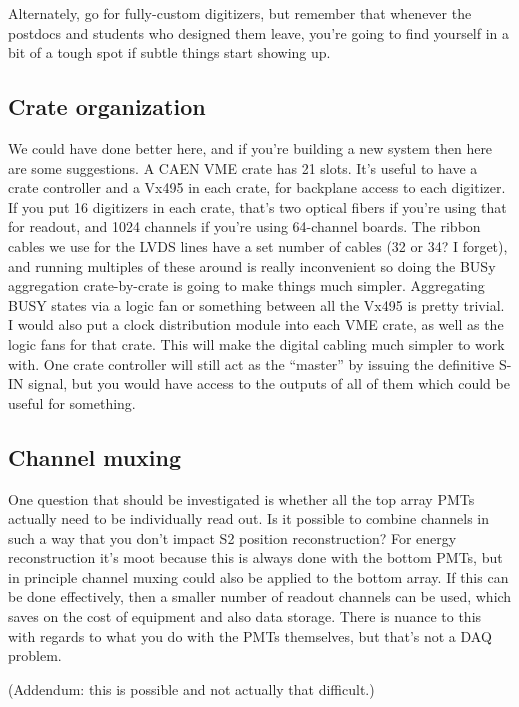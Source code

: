 Alternately, go for fully-custom digitizers, but remember that whenever the postdocs and students who designed them leave, you're going to find yourself in a bit of a tough spot if subtle things start showing up.

\subsection{Crate organization}

We could have done better here, and if you're building a new system then here are some suggestions.
A CAEN VME crate has 21 slots.
It's useful to have a crate controller and a Vx495 in each crate, for backplane access to each digitizer.
If you put 16 digitizers in each crate, that's two optical fibers if you're using that for readout, and 1024 channels if you're using 64-channel boards.
The ribbon cables we use for the LVDS lines have a set number of cables (32 or 34? I forget), and running multiples of these around is really inconvenient so doing the BUSy aggregation crate-by-crate is going to make things much simpler.
Aggregating BUSY states via a logic fan or something between all the Vx495 is pretty trivial.
I would also put a clock distribution module into each VME crate, as well as the logic fans for that crate.
This will make the digital cabling much simpler to work with.
One crate controller will still act as the ``master'' by issuing the definitive S-IN signal, but you would have access to the outputs of all of them which could be useful for something.

\subsection{Channel muxing}

One question that should be investigated is whether all the top array PMTs actually need to be individually read out.
Is it possible to combine channels in such a way that you don't impact S2 position reconstruction?
For energy reconstruction it's moot because this is always done with the bottom PMTs, but in principle channel muxing could also be applied to the bottom array.
If this can be done effectively, then a smaller number of readout channels can be used, which saves on the cost of equipment and also data storage.
There is nuance to this with regards to what you do with the PMTs themselves, but that's not a DAQ problem.

(Addendum: this is possible and not actually that difficult.)
